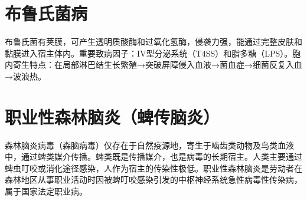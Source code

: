 \section{布鲁氏菌病}

布鲁氏菌有荚膜，可产生透明质酸酶和过氧化氢酶，侵袭力强，能通过完整皮肤和黏膜进入宿主体内。重要致病因子：IV型分泌系统（T4SS）和脂多糖（LPS）。胞内寄生特点：在局部淋巴结生长繁殖→突破屏障侵入血液→菌血症→细菌反复入血→波浪热。

\section{职业性森林脑炎（蜱传脑炎）}

森林脑炎病毒（森脑病毒）仅存在于自然疫源地，寄生于啮齿类动物及鸟类血液中，通过蜱类媒介传播。蜱类既是传播媒介，也是病毒的长期宿主。人类主要通过蜱虫叮咬或消化途径感染，人作为宿主的传染性极低。职业性森林脑炎是劳动者在森林地区从事职业活动时因被蜱叮咬感染引发的中枢神经系统急性病毒性传染病，属于国家法定职业病。

\newpage

\newpage